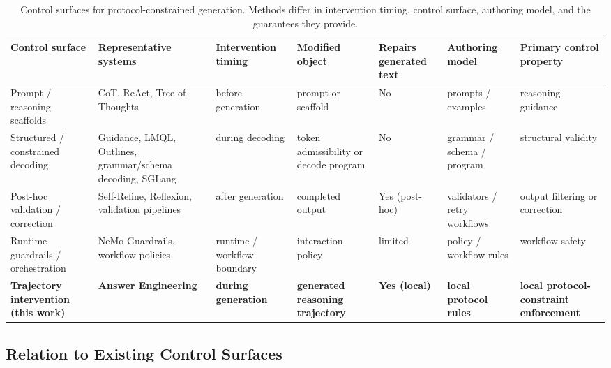 \documentclass[twocolumn]{article}
\begin{document}
\begin{table}[t]
\centering
\scriptsize
\setlength{\tabcolsep}{2.8pt}
\renewcommand{\arraystretch}{1.24}
\caption{Control surfaces for protocol-constrained generation. Methods differ in
intervention timing, control surface, authoring model, and the guarantees they
provide.}\label{tab:control-surfaces}
\begin{tabularx}{\textwidth}{
>{\raggedright\arraybackslash}p{}
>{\raggedright\arraybackslash}p{}
>{\raggedright\arraybackslash}p{}
>{\raggedright\arraybackslash}p{}
>{\raggedright\arraybackslash}p{}
>{\raggedright\arraybackslash}p{}
>{\raggedright\arraybackslash}X}
\toprule
Control surface &
Representative systems &
Intervention timing &
Modified object &
Repairs generated text &
Authoring model &
Primary control property \\
\midrule
Prompt / reasoning scaffolds &
CoT, ReAct, Tree-of-Thoughts &
before generation &
prompt or scaffold &
No &
prompts / examples &
reasoning guidance \\
\addlinespace
Structured / constrained decoding &
Guidance, LMQL, Outlines, grammar/schema decoding, SGLang &
during decoding &
token admissibility or decode program &
No &
grammar / schema / program &
structural validity \\
\addlinespace
Post-hoc validation / correction &
Self-Refine, Reflexion, validation pipelines &
after generation &
completed output &
Yes (post-hoc) &
validators / retry workflows &
output filtering or correction \\
\addlinespace
Runtime guardrails / orchestration &
NeMo Guardrails, workflow policies &
runtime / workflow boundary &
interaction policy &
limited &
policy / workflow rules &
workflow safety \\
\addlinespace
\textbf{Trajectory intervention (this work)} &
\textbf{Answer Engineering} &
\textbf{during generation} &
\textbf{generated reasoning trajectory} &
\textbf{Yes (local)} &
\textbf{local protocol rules} &
\textbf{local protocol-constraint enforcement} \\
\bottomrule
\end{tabularx}
\end{table}

\subsection{Relation to Existing Control Surfaces}
\end{document}
